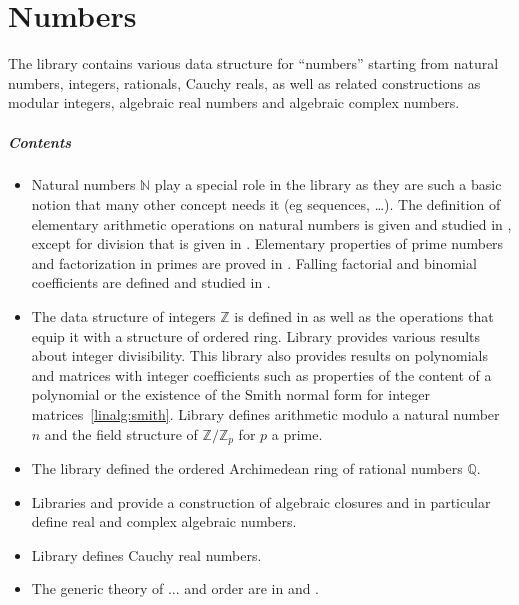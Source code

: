 \chapter{Numbers}

The library contains various data structure for ``numbers''
starting from natural numbers, integers, rationals, Cauchy reals, as well as
related constructions as modular integers, algebraic real numbers and algebraic
complex numbers.

\paragraph{Contents}
\begin{itemize}

\item
Natural numbers $\mathbb{N}$ play a special role in the \mcbMC{} library as they
are such a basic notion that many other concept needs it (eg sequences, \ldots).
The definition of elementary arithmetic operations on natural numbers
is given and studied in , except for division
that is given in .  Elementary properties of
prime numbers and factorization in primes are proved in
.  Falling factorial and binomial coefficients are defined
and studied in .

\item
The data structure of integers $\mathbb{Z}$ is defined in 
as well as the operations that equip it with a structure of
ordered ring. Library  provides various
results about integer divisibility.  This library also provides
results on polynomials and matrices with integer coefficients
such as properties of the content of a polynomial or the
existence of the Smith normal form for integer matrices~\ref{linalg:smith}.
Library  defines arithmetic modulo a natural number $n$
and the field structure of $\mathbb{Z}/\mathbb{Z}_p$ for $p$ a prime.

\item
The library  defined the ordered Archimedean ring of
rational numbers $\mathbb{Q}$.

\item
Libraries  and 
provide a construction of algebraic closures and in particular define
real and complex algebraic numbers.

\item
Library  defines Cauchy real numbers.

\item
The generic theory of ... and order are in 
and .

\end{itemize}

